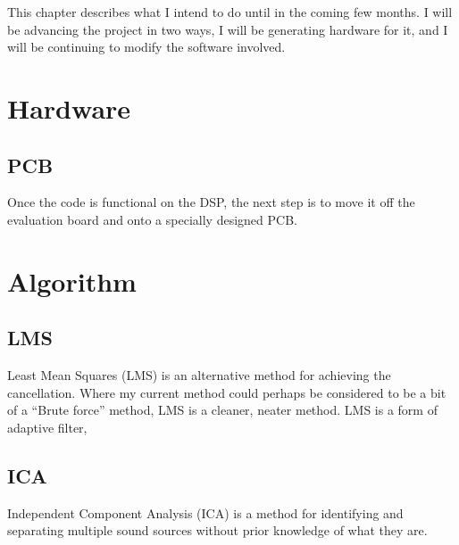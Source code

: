 This chapter describes what I intend to do until in the coming few months.
I will be advancing the project in two ways, I will be generating hardware for it, and I will be continuing to modify the software involved.

\section{Hardware}
\subsection{PCB}
Once the code is functional on the DSP, the next step is to move it off the evaluation board and onto a specially designed PCB.

\section{Algorithm}
\subsection{LMS}
Least Mean Squares (LMS) is an alternative method for achieving the cancellation.
Where my current method could perhaps be considered to be a bit of a ``Brute force'' method, LMS is a cleaner, neater method.
LMS is a form of adaptive filter,

\subsection{ICA}
Independent Component Analysis (ICA) is a method for identifying and separating multiple sound sources without prior knowledge of what they are.
